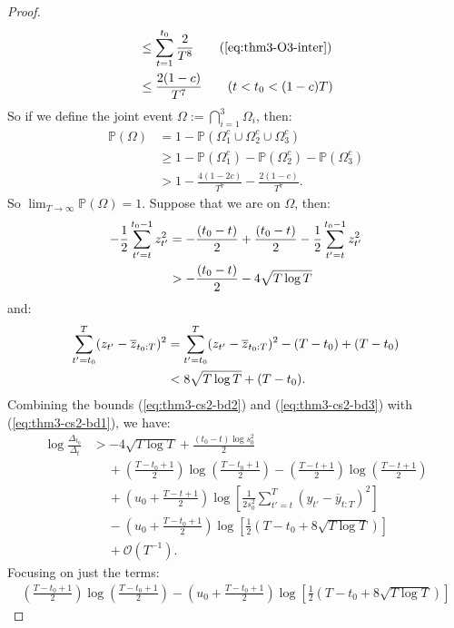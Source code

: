 \documentclass{article}
\begin{document}
\begin{proof}
\begin{align*}
    &\leq \sum_{t=1}^{t_0} \frac{2}{T^8} \tag{\ref{eq:thm3-O3-inter}} \\
    &\leq \frac{2(1-c)}{T^7} \tag{$t < t_0 < (1-c)T$}
\end{align*}
So if we define the joint event $\Omega := \bigcap_{i=1}^3 \Omega_i$, then:
\begin{align*}
    \mathbb{P}(\Omega) &= 1 - \mathbb{P}(\Omega^c_1 \cup \Omega^c_2 \cup \Omega^c_3) \\
    &\geq 1 - \mathbb{P}(\Omega^c_1) - \mathbb{P}(\Omega^c_2) - \mathbb{P}(\Omega^c_3) \tag{union bound} \\
    &> 1 - \frac{4(1-2c)}{T^7} - \frac{2(1-c)}{T^7}.
\end{align*}
So $\lim_{T\to\infty} \mathbb{P}(\Omega)  = 1$. Suppose that we are on $\Omega$, then:
\begin{align}
     - \frac{1}{2} \sum_{t' = t}^{t_0 - 1} z_{t'}^2 &= - \frac{(t_0 - t)}{2} + \frac{(t_0 - t)}{2} - \frac{1}{2} \sum_{t' = t}^{t_0 - 1} z_{t'}^2 \notag \\
     &> - \frac{(t_0 - t)}{2} - 4\sqrt{T\log T} \label{eq:thm3-cs2-bd2}
\end{align}
and:
\begin{align}
    \sum_{t'=t_0}^T  (z_{t'} - \overline{z}_{t_0:T})^2 &= \sum_{t'=t_0}^T  (z_{t'} - \overline{z}_{t_0:T})^2 - (T - t_0) + (T-t_0) \notag \\
    &< 8\sqrt{T \log T} + (T - t_0). \label{eq:thm3-cs2-bd3}
\end{align}
Combining the bounds (\ref{eq:thm3-cs2-bd2}) and (\ref{eq:thm3-cs2-bd3}) with (\ref{eq:thm3-cs2-bd1}), we have:
\begin{align*}
    \log \frac{\Delta_{t_0}}{\Delta_t} &> -4\sqrt{T \log T} + \frac{(t_0 - t)\log s_0^2}{2} \\
    &\quad\: + \left(\frac{T - t_0 + 1}{2}\right) \log\left(\frac{T-t_0+1}{2}\right) - \left(\frac{T - t + 1}{2}\right) \log\left(\frac{T-t+1}{2}\right) \\
    &\quad\: + \left(u_0 + \frac{T - t +1}{2}\right)\log\left[ \frac{1}{2s_0^2}\sum_{t'=t}^T (y_{t'} - \overline{y}_{t:T})^2 \right] \\
    &\quad\: - \left(u_0 + \frac{T - t_0 +1}{2}\right)\log\left[\frac{1}{2}(T-t_0 +8\sqrt{T \log T})\right] \\
    &\quad\: +  \mathcal{O}(T^{-1}). 
\end{align*}
Focusing on just the terms:
\begin{align*}
    \left(\frac{T - t_0 + 1}{2}\right) \log\left(\frac{T-t_0+1}{2}\right) - \left(u_0 + \frac{T - t_0 +1}{2}\right)\log\left[\frac{1}{2}(T-t_0 +8\sqrt{T \log T})\right]

\end{align*}
\end{proof}
\end{document}
